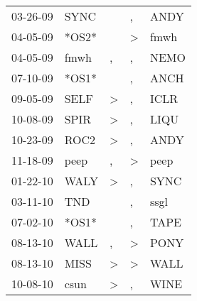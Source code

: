 \begin{supertabular}{p{0.07\textwidth}p{0.06\textwidth}p{0.02\textwidth}p{0.02\textwidth}p{0.06\textwidth}}
          03-26-09\textsuperscript{} &           SYNC\textsuperscript{} &                  &                , &           ANDY\textsuperscript{} \\
          04-05-09\textsuperscript{} &                            *OS2* &                  &     \textgreater &           fmwh\textsuperscript{} \\
          04-05-09\textsuperscript{} &           fmwh\textsuperscript{} &                , &                , &           NEMO\textsuperscript{} \\
          07-10-09\textsuperscript{} &                            *OS1* &                  &                , &           ANCH\textsuperscript{} \\
          09-05-09\textsuperscript{} &           SELF\textsuperscript{} &     \textgreater &                , &           ICLR\textsuperscript{} \\
          10-08-09\textsuperscript{} &           SPIR\textsuperscript{} &     \textgreater &                , &           LIQU\textsuperscript{} \\
          10-23-09\textsuperscript{} &           ROC2\textsuperscript{} &     \textgreater &                , &           ANDY\textsuperscript{} \\
          11-18-09\textsuperscript{} &           peep\textsuperscript{} &                , &     \textgreater &           peep\textsuperscript{} \\
          01-22-10\textsuperscript{} &           WALY\textsuperscript{} &     \textgreater &                , &           SYNC\textsuperscript{} \\
          03-11-10\textsuperscript{} &            TND\textsuperscript{} &                  &                , &           ssgl\textsuperscript{} \\
          07-02-10\textsuperscript{} &                            *OS1* &                  &                , &           TAPE\textsuperscript{} \\
          08-13-10\textsuperscript{} &           WALL\textsuperscript{} &                , &     \textgreater &           PONY\textsuperscript{} \\
          08-13-10\textsuperscript{} &           MISS\textsuperscript{} &     \textgreater &     \textgreater &           WALL\textsuperscript{} \\
          10-08-10\textsuperscript{} &           csun\textsuperscript{} &     \textgreater &                , &           WINE\textsuperscript{} \\

\end{supertabular}
